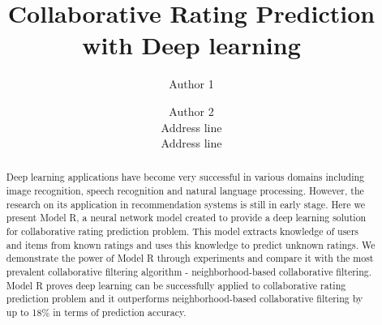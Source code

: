 \documentclass[letterpaper]{article}
\title{Collaborative Rating Prediction with Deep learning}
\author{Author 1 \and Author 2\\
	Address line\\
	Address line\\
}
\begin{document}
\maketitle

\begin{abstract}
	Deep learning applications have become very successful in various domains 
	including image recognition, speech recognition and natural language 
	processing.
	However, the research on its application in recommendation systems is 
	still in early stage.
	Here we present Model R, a neural network model created to provide a deep 
	learning solution for collaborative rating prediction problem.
	This model extracts knowledge of users and items from known ratings and 
	uses this knowledge to predict unknown ratings.
	We demonstrate the power of Model R through experiments and compare it with 
	the most prevalent collaborative filtering algorithm - neighborhood-based 
	collaborative filtering.
	Model R proves deep learning can be successfully applied to collaborative 
	rating prediction problem and it outperforms neighborhood-based 
	collaborative filtering by up to 18\% in terms of prediction accuracy.
\end{abstract}
\end{document}
